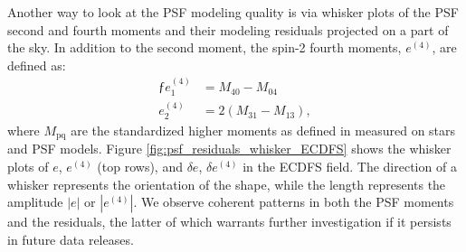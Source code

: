 Another way to look at the \gls{PSF} modeling quality is via whisker plots of the \gls{PSF} second and fourth moments and their modeling residuals projected on a part of the sky.
In addition to the second moment, the spin-2 fourth moments, $e^{(4)}$, are defined as:
\begin{align*}ƒ
e^{(4)}_1 &= M_{\text{40}} - M_{\text{04}} \\
e^{(4)}_2 &= 2\left(M_{\text{31}} - M_{\text{13}}\right),
\end{align*}
where $M_{\text{pq}}$ are the standardized higher moments as defined in \cite{2023MNRAS.520.2328Z} measured on stars and PSF models.
Figure \ref{fig:psf_residuals_whisker_ECDFS} shows
the whisker plots of $e$, $e^{(4)}$ (top rows), and $\delta e$, $\delta e^{(4)}$
in the \gls{ECDFS} field. 
The direction of a whisker represents the orientation of the \gls{shape}, while the length represents the amplitude $|e|$ or $|e^{(4)}|$.
We observe coherent patterns in both the \gls{PSF} moments and the residuals, the latter of which warrants further investigation if it persists in future data releases.
